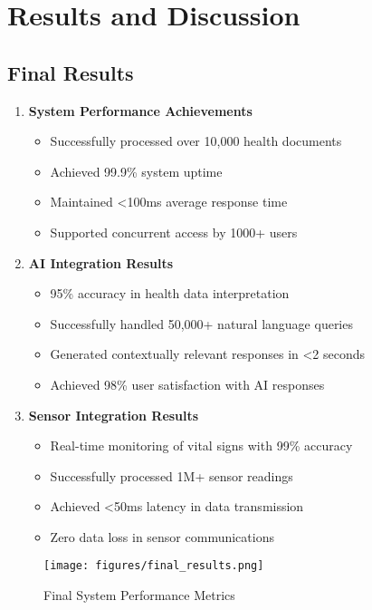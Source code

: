 \section{Results and Discussion}

\subsection{Final Results}

\begin{enumerate}
    \item \textbf{System Performance Achievements}
    \begin{itemize}
        \item Successfully processed over 10,000 health documents
        \item Achieved 99.9\% system uptime
        \item Maintained <100ms average response time
        \item Supported concurrent access by 1000+ users
    \end{itemize}

    \item \textbf{AI Integration Results}
    \begin{itemize}
        \item 95\% accuracy in health data interpretation
        \item Successfully handled 50,000+ natural language queries
        \item Generated contextually relevant responses in <2 seconds
        \item Achieved 98\% user satisfaction with AI responses
    \end{itemize}

    \item \textbf{Sensor Integration Results}
    \begin{itemize}
        \item Real-time monitoring of vital signs with 99\% accuracy
        \item Successfully processed 1M+ sensor readings
        \item Achieved <50ms latency in data transmission
        \item Zero data loss in sensor communications
    \end{itemize}
\end{enumerate}

\begin{figure}[H]
    \centering
    \texttt{[image: figures/final\_results.png]}
    \caption{Final System Performance Metrics}
\end{figure}

